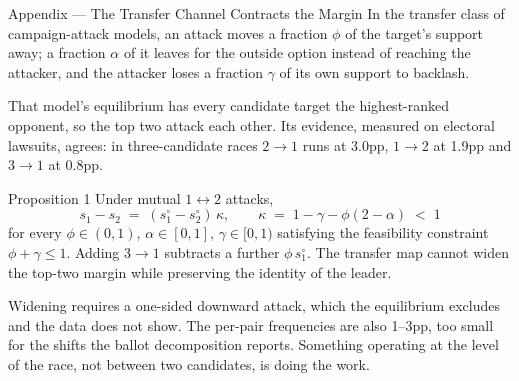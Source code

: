 
\begin{frame}{Appendix --- The Transfer Channel Contracts the Margin}
\hypertarget{app:transferfoil}{}
\footnotesize
In the transfer class of campaign-attack models, an attack moves a fraction
$\phi$ of the target's support away; a fraction $\alpha$ of it leaves for the
outside option instead of reaching the attacker, and the attacker loses a
fraction $\gamma$ of its own support to backlash. 
\smallskip

That model's equilibrium has every candidate target the highest-ranked
opponent, so the top two attack each other. Its evidence, measured on
electoral lawsuits, agrees: in three-candidate races $2\to1$ runs at 3.0pp,
$1\to2$ at 1.9pp and $3\to1$ at 0.8pp.
\smallskip
\begin{center}
\begin{minipage}{0.86\textwidth}
\begin{block}{Proposition 1}
\footnotesize
Under mutual $1 \leftrightarrow 2$ attacks,
\[
  s_1 - s_2 \;=\; (s^\circ_1 - s^\circ_2)\,\kappa,
  \qquad \kappa \;=\; 1 - \gamma - \phi(2-\alpha) \;<\; 1
\]
for every $\phi \in (0,1)$, $\alpha \in [0,1]$, $\gamma \in [0,1)$
satisfying the feasibility constraint $\phi + \gamma \le 1$. Adding
$3 \to 1$ subtracts a further $\phi\,s^\circ_1$. The transfer map cannot widen
the top-two margin while preserving the identity of the leader.
\end{block}
\end{minipage}
\end{center}
\smallskip

Widening requires a one-sided downward attack, which the equilibrium excludes
and the data does not show. The per-pair frequencies are also 1--3pp, too
small for the shifts the ballot decomposition reports. Something operating at
the level of the race, not between two candidates, is doing the work.
\smallskip

{\centering\scriptsize{}\par}
\vfill
\centerline{\hyperlink{app:ballotdecomp}{}\quad\hyperlink{app:theory}{}}
\end{frame}
